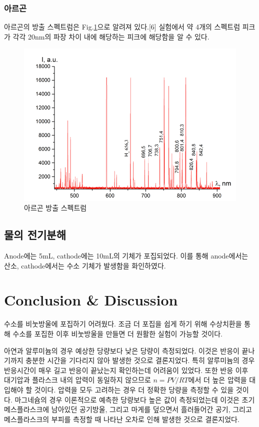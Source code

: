 \documentclass[%
 reprint,
 amsmath,amssymb,
 aps,
]{revtex4-2}
\begin{document}
\subsubsection{\label{sec:level3}아르곤}
아르곤의 방출 스펙트럼은 Fig.\ref{fig:Ar}으로 알려져 있다.[6] 실험에서 약 4개의 스펙트럼 피크가 각각 20nm의 파장 차이 내에 해당하는 피크에 해당함을 알 수 있다.

\begin{figure}[htbp]
	\includegraphics[width = 0.9\linewidth]{Ar.png}%
	\caption{\label{fig:Ar} 아르곤 방출 스펙트럼}
\end{figure}

\subsection{\label{sec:level2}물의 전기분해}
Anode에는 5mL, cathode에는 10mL의 기체가 포집되었다. 이를 통해 anode에서는 산소, cathode에서는 수소 기체가 발생함을 화인하였다.

\section{\label{sec:level1}Conclusion \& Discussion}
수소를 비눗방울에 포집하기 어려웠다. 조금 더 포집을 쉽게 하기 위해 수상치환을 통해 수소를 포집한 이후 비눗방울을 만들면 더 원활한 실험이 가능할 것이다.

아연과 알루미늄의 경우 예상한 당량보다 낮은 당량이 측정되었다. 이것은 반응이 끝나기까지 충분한 시간을 기다리지 않아 발생한 것으로 결론지었다. 특히 알루미늄의 경우 반응시간이 매우 길고 반응이 끝났는지 확인하는데 어려움이 있었다. 또한 반응 이후 대기압과 플라스크 내의 압력이 동일하지 않으므로 $n = PV/RT$에서 더 높은 압력을 대입해야 할 것이다. 압력을 모두 고려하는 경우 더 정확한 당량을 측정할 수 있을 것이다. 마그네슘의 경우 이론적으로 예측한 당량보다 높은 값이 측정되었는데 이것은 초기 메스플라스크에 남아있던 공기방울, 그리고 마게를 덮으면서 흘러들어간 공기, 그리고 메스플라스크의 부피를 측정할 때 나타난 오차로 인해 발생한 것으로 결론지었다.
\end{document}
